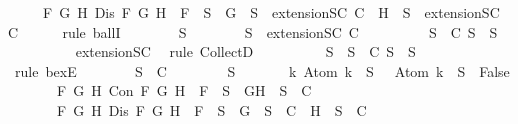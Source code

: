 \begin{isabellebody}
\ \ \ \ {\isasymand}\ {\isacharparenleft}{\isasymforall}F\ G\ H{\isachardot}\ Dis\ F\ G\ H\ {\isasymlongrightarrow}\ F\ {\isasymin}\ S\ {\isasymlongrightarrow}\ {\isacharbraceleft}G{\isacharbraceright}\ {\isasymunion}\ S\ {\isasymin}\ {\isacharparenleft}extensionSC\ C{\isacharparenright}\ {\isasymor}\ {\isacharbraceleft}H{\isacharbraceright}\ {\isasymunion}\ S\ {\isasymin}\ {\isacharparenleft}extensionSC\ C{\isacharparenright}{\isacharparenright}{\isacharparenright}{\isachardoublequoteclose}\isanewline
\ \ \ \ \isamarkupfalse%
\ {\isacharparenleft}rule\ ballI{\isacharparenright}\isanewline
\ \ \ \ \ \ \isamarkupfalse%
\ S{\isacharprime}\isanewline
\ \ \ \ \ \ \isamarkupfalse%
\ {\isachardoublequoteopen}S{\isacharprime}\ {\isasymin}\ {\isacharparenleft}extensionSC\ C{\isacharparenright}{\isachardoublequoteclose}\isanewline
\ \ \ \ \ \ \isamarkupfalse%
\ \isamarkupfalse%
\ {}{\isacharcolon}{\isachardoublequoteopen}{\isasymexists}S\ {\isasymin}\ C{\isachardot}\ S{\isacharprime}\ {\isasymsubseteq}\ S{\isachardoublequoteclose}\isanewline
\ \ \ \ \ \ \ \ \isamarkupfalse%
\ extensionSC\ \isamarkupfalse%
\ {\isacharparenleft}rule\ CollectD{\isacharparenright}\ \ \isanewline
\ \ \ \ \ \ \isamarkupfalse%
\ S\ \ {\isachardoublequoteopen}S\ {\isasymin}\ C{\isachardoublequoteclose}\ {\isachardoublequoteopen}S{\isacharprime}\ {\isasymsubseteq}\ S{\isachardoublequoteclose}\isanewline
\ \ \ \ \ \ \ \ \isamarkupfalse%
\ {}\ \isamarkupfalse%
\ {\isacharparenleft}rule\ bexE{\isacharparenright}\isanewline
\ \ \ \ \ \ \isamarkupfalse%
\ {\isachardoublequoteopen}{\isasymforall}S\ {\isasymin}\ C{\isachardot}\isanewline
\ \ \ \ \ \ {\isasymbottom}\ {\isasymnotin}\ S\isanewline
\ \ \ \ \ \ {\isasymand}\ {\isacharparenleft}{\isasymforall}k{\isachardot}\ Atom\ k\ {\isasymin}\ S\ {\isasymlongrightarrow}\ \isactrlbold {\isasymnot}\ {\isacharparenleft}Atom\ k{\isacharparenright}\ {\isasymin}\ S\ {\isasymlongrightarrow}\ False{\isacharparenright}\isanewline
\ \ \ \ \ \ {\isasymand}\ {\isacharparenleft}{\isasymforall}F\ G\ H{\isachardot}\ Con\ F\ G\ H\ {\isasymlongrightarrow}\ F\ {\isasymin}\ S\ {\isasymlongrightarrow}\ {\isacharbraceleft}G{\isacharcomma}H{\isacharbraceright}\ {\isasymunion}\ S\ {\isasymin}\ C{\isacharparenright}\isanewline
\ \ \ \ \ \ {\isasymand}\ {\isacharparenleft}{\isasymforall}F\ G\ H{\isachardot}\ Dis\ F\ G\ H\ {\isasymlongrightarrow}\ F\ {\isasymin}\ S\ {\isasymlongrightarrow}\ {\isacharbraceleft}G{\isacharbraceright}\ {\isasymunion}\ S\ {\isasymin}\ C\ {\isasymor}\ {\isacharbraceleft}H{\isacharbraceright}\ {\isasymunion}\ S\ {\isasymin}\ C{\isacharparenright}{\isachardoublequoteclose}\isanewline

\end{isabellebody}
